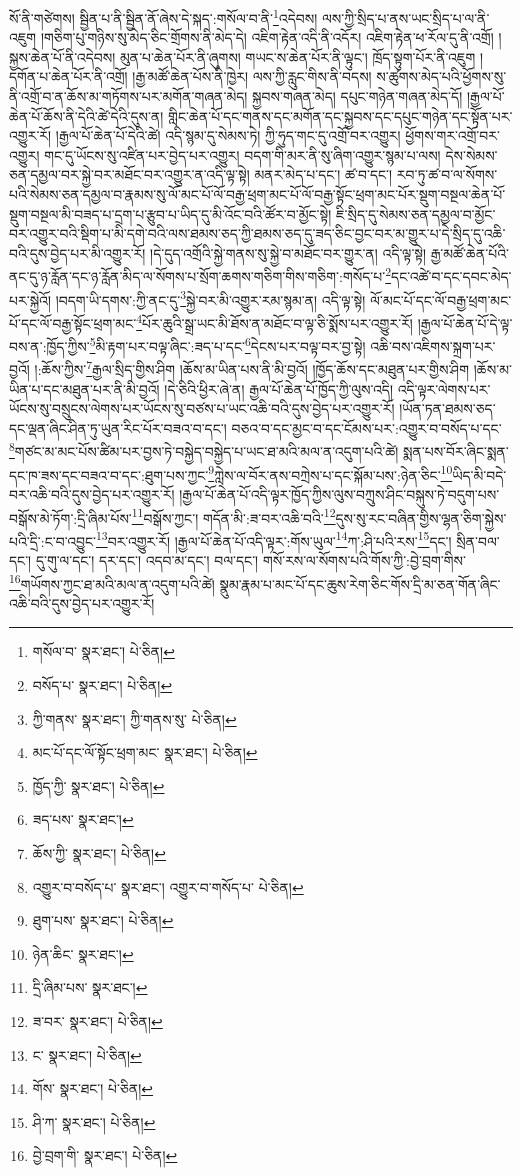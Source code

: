 སོ་ནི་གཙེགས། སྦྱིན་པ་ནི་སྦྱིན་ནོ་ཞེས་དེ་སྐད་:གསོལ་བ་ནི་\footnote{གསོལ་བ་  སྣར་ཐང་།  པེ་ཅིན། }འདེབས། ལས་ཀྱི་སྲིད་པ་ནས་ཡང་སྲིད་པ་ལ་ནི་འཇུག །གཅིག་པུ་གཉིས་སུ་མེད་ཅིང་གྲོགས་ནི་མེད་དེ། འཇིག་རྟེན་འདི་ནི་འདོར། འཇིག་རྟེན་ཕ་རོལ་དུ་ནི་འགྲོ། །སྐྱས་ཆེན་པོ་ནི་འདེབས། མུན་པ་ཆེན་པོར་ནི་ཞུགས། གཡང་ས་ཆེན་པོར་ནི་ལྟུང་། ཁྲོད་སྟུག་པོར་ནི་འཇུག །དགོན་པ་ཆེན་པོར་ནི་འགྲོ། །རྒྱ་མཚོ་ཆེན་པོས་ནི་ཁྱེར། ལས་ཀྱི་རླུང་གིས་ནི་བདས། ས་ཚུགས་མེད་པའི་ཕྱོགས་སུ་ནི་འགྲོ་བ་ན་ཆོས་མ་གཏོགས་པར་མགོན་གཞན་མེད། སྐྱབས་གཞན་མེད། དཔུང་གཉེན་གཞན་མེད་དོ། །རྒྱལ་པོ་ཆེན་པོ་ཆོས་ནི་དེའི་ཚེ་དེའི་དུས་ན། གླིང་ཆེན་པོ་དང་གནས་དང་མགོན་དང་སྐྱབས་དང་དཔུང་གཉེན་དང་སྟོན་པར་འགྱུར་རོ། །རྒྱལ་པོ་ཆེན་པོ་དེའི་ཚེ། འདི་སྙམ་དུ་སེམས་ཏེ། ཀྱི་ཧུད་གང་དུ་འགྲོ་བར་འགྱུར། ཕྱོགས་གར་འགྲོ་བར་འགྱུར། གང་དུ་ཡོངས་སུ་འཛིན་པར་བྱེད་པར་འགྱུར། བདག་གི་མར་ནི་སུ་ཞིག་འགྱུར་སྙམ་པ་ལས། དེས་སེམས་ཅན་དམྱལ་བར་སྐྱེ་བར་མཐོང་བར་འགྱུར་ན་འདི་ལྟ་སྟེ། མནར་མེད་པ་དང་། ཚ་བ་དང་། རབ་ཏུ་ཚ་བ་ལ་སོགས་པའི་སེམས་ཅན་དམྱལ་བ་རྣམས་སུ་ལོ་མང་པོ་ལོ་བརྒྱ་ཕྲག་མང་པོ་ལོ་བརྒྱ་སྟོང་ཕྲག་མང་པོར་སྡུག་བསྔལ་ཆེན་པོ་སྡུག་བསྔལ་མི་བཟད་པ་དྲག་པ་རྩུབ་པ་ཡིད་དུ་མི་འོང་བའི་ཚོར་བ་མྱོང་སྟེ། ཇི་སྲིད་དུ་སེམས་ཅན་དམྱལ་བ་མྱོང་བར་འགྱུར་བའི་སྡིག་པ་མི་དགེ་བའི་ལས་ཐམས་ཅད་ཀྱི་ཐམས་ཅད་དུ་ཟད་ཅིང་བྱང་བར་མ་གྱུར་པ་དེ་སྲིད་དུ་འཆི་བའི་དུས་བྱེད་པར་མི་འགྱུར་རོ། །དེ་དུད་འགྲོའི་སྐྱེ་གནས་སུ་སྐྱེ་བ་མཐོང་བར་གྱུར་ན། འདི་ལྟ་སྟེ། རྒྱ་མཚོ་ཆེན་པོའི་ནང་དུ་ཉ་རློན་དང་ཉ་རློན་མིད་ལ་སོགས་པ་སྲོག་ཆགས་གཅིག་གིས་གཅིག་:གསོད་པ་\footnote{བསོད་པ་  སྣར་ཐང་།  པེ་ཅིན། }དང་འཚེ་བ་དང་དབང་མེད་པར་སྐྱེའོ། །བདག་ཡི་དགས་:ཀྱི་ནང་དུ་\footnote{ཀྱི་གནས་  སྣར་ཐང་། ཀྱི་གནས་སུ་  པེ་ཅིན། }སྐྱེ་བར་མི་འགྱུར་རམ་སྙམ་ན། འདི་ལྟ་སྟེ། ལོ་མང་པོ་དང་ལོ་བརྒྱ་ཕྲག་མང་པོ་དང་ལོ་བརྒྱ་སྟོང་ཕྲག་མང་\footnote{མང་པོ་དང་ལོ་སྟོང་ཕྲག་མང་  སྣར་ཐང་།  པེ་ཅིན། }པོར་ཆུའི་སྒྲ་ཡང་མི་ཐོས་ན་མཐོང་བ་ལྟ་ཅི་སྨོས་པར་འགྱུར་རོ། །རྒྱལ་པོ་ཆེན་པོ་དེ་ལྟ་བས་ན་:ཁྱོད་ཀྱིས་\footnote{ཁྱོད་ཀྱི་  སྣར་ཐང་།  པེ་ཅིན། }མི་རྟག་པར་བལྟ་ཞིང་:ཟད་པ་དང་\footnote{ཟད་པས་  སྣར་ཐང་། }དེངས་པར་བལྟ་བར་བྱ་སྟེ། འཆི་བས་འཇིགས་སྐྲག་པར་བྱའོ། །:ཆོས་ཀྱིས་\footnote{ཆོས་ཀྱི་  སྣར་ཐང་།  པེ་ཅིན། }རྒྱལ་སྲིད་གྱིས་ཤིག །ཆོས་མ་ཡིན་པས་ནི་མི་བྱའོ། །ཁྱོད་ཆོས་དང་མཐུན་པར་གྱིས་ཤིག །ཆོས་མ་ཡིན་པ་དང་མཐུན་པར་ནི་མི་བྱའོ། །དེ་ཅིའི་ཕྱིར་ཞེ་ན། རྒྱལ་པོ་ཆེན་པོ་ཁྱོད་ཀྱི་ལུས་འདི། འདི་ལྟར་ལེགས་པར་ཡོངས་སུ་བསྲུངས་ལེགས་པར་ཡོངས་སུ་བཙས་པ་ཡང་འཆི་བའི་དུས་བྱེད་པར་འགྱུར་རོ། །ཡོན་ཏན་ཐམས་ཅད་དང་ལྡན་ཞིང་ཤིན་ཏུ་ཡུན་རིང་པོར་བཟའ་བ་དང་། བཅའ་བ་དང་མྱང་བ་དང་ངོམས་པར་:འགྱུར་བ་བསོད་པ་དང་\footnote{འགྱུར་བ་བསོད་པ་  སྣར་ཐང་། འགྱུར་བ་གསོད་པ་  པེ་ཅིན། }གཙང་མ་མང་པོས་ཚིམ་པར་བྱས་ཏེ་བསྐྱེད་བསྐྱེད་པ་ཡང་ཐ་མའི་མལ་ན་འདུག་པའི་ཚེ། སྨན་པས་བོར་ཞིང་སྨན་དང་ཁ་ཟས་དང་བཟའ་བ་དང་:ཐུག་པས་ཀྱང་\footnote{ཐུག་པས་  སྣར་ཐང་།  པེ་ཅིན། }ཀླེས་ལ་བོར་ནས་བཀྲེས་པ་དང་སྐོམ་པས་:ཉེན་ཅིང་\footnote{ཉེན་ཆིང་  སྣར་ཐང་། }ཡིད་མི་བདེ་བར་འཆི་བའི་དུས་བྱེད་པར་འགྱུར་རོ། །རྒྱལ་པོ་ཆེན་པོ་འདི་ལྟར་ཁྱོད་ཀྱིས་ལུས་བཀྲུས་ཤིང་བསྐུས་ཏེ་བདུག་པས་བསྒོས་མེ་ཏོག་:དྲི་ཞིམ་པོས་\footnote{དྲི་ཞིམ་པས་  སྣར་ཐང་། }བསྒོས་ཀྱང་། གདོན་མི་:ཟ་བར་འཆི་བའི་\footnote{ཟ་བར་  སྣར་ཐང་།  པེ་ཅིན། }དུས་སུ་རང་བཞིན་གྱིས་ལྷན་ཅིག་སྐྱེས་པའི་དྲི་:ང་བ་འབྱུང་\footnote{ང་  སྣར་ཐང་།  པེ་ཅིན། }བར་འགྱུར་རོ། །རྒྱལ་པོ་ཆེན་པོ་འདི་ལྟར་:གོས་ཡུལ་\footnote{གོས་  སྣར་ཐང་།  པེ་ཅིན། }ཀ་:ཤི་པའི་རས་\footnote{ཤི་ཀ་  སྣར་ཐང་།  པེ་ཅིན། }དང་། སྲིན་བལ་དང་། དུ་གུ་ལ་དང་། དར་དང་། འདབ་མ་དང་། བལ་དང་། གསོ་རས་ལ་སོགས་པའི་གོས་ཀྱི་:བྱེ་བྲག་གིས་\footnote{བྱེ་བྲག་གི་  སྣར་ཐང་།  པེ་ཅིན། }གཡོགས་ཀྱང་ཐ་མའི་མལ་ན་འདུག་པའི་ཚེ། སྣུམ་རྣམ་པ་མང་པོ་དང་ཆུས་རེག་ཅིང་གོས་དྲི་མ་ཅན་གོན་ཞིང་འཆི་བའི་དུས་བྱེད་པར་འགྱུར་རོ། 